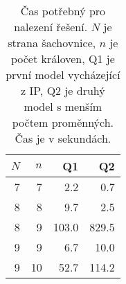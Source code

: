 \documentclass[11pt]{article}
\begin{document}
\begin{table}
\begin{center}
\begin{tabular}{|r|r|r|r|}
    \hline
    $N$ & $n$ & Q1      & Q2 \\
    \hline
    \hline
    7   & 7   & 2.2     & 0.7 \\
    \hline
    8   & 8   & 9.7     & 2.5 \\
    \hline
    8   & 9   & 103.0   & 829.5 \\
    \hline
    9   & 9   & 6.7     & 10.0 \\
    \hline
    9   & 10  & 52.7    & 114.2  \\
    \hline
\end{tabular}
\caption{Čas potřebný pro nalezení řešení. $N$ je strana šachovnice, $n$ je
počet královen, Q1 je první model vycházející z IP, Q2 je druhý model s menším
počtem proměnných. Čas je v sekundách.}
\end{center}
\end{table}
\end{document}
